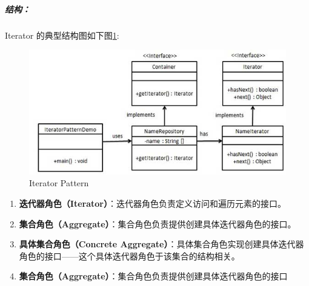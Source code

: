 \documentclass[UTF8,a4paper,12pt]{ctexbook}
\begin{document}
		\subparagraph{结构：}Iterator 的典型结构图如下图\ref{Iterator}:
		\begin{figure}[h]
			\centering
			\includegraphics[scale= 0.7]{Iterator.jpg}
			\caption{Iterator Pattern}
			\label{Iterator}
		\end{figure}
		
			\begin{enumerate}[itemindent = 1em]
				\item \textbf{迭代器角色（Iterator）}：迭代器角色负责定义访问和遍历元素的接口。
				\item \textbf{集合角色（Aggregate）}：集合角色负责提供创建具体迭代器角色的接口。
				\item \textbf{具体集合角色（Concrete Aggregate）}：具体集合角色实现创建具体迭代器角色的接口——这个具体迭代器角色于该集合的结构相关。
				\item \textbf{集合角色（Aggregate）}：集合角色负责提供创建具体迭代器角色的接口
			\end{enumerate}
\end{document}
